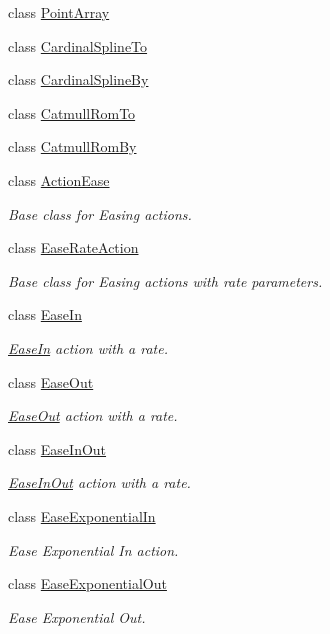 \begin{DoxyCompactItemize}
class \hyperlink{classPointArray}{Point\+Array}
\item 
class \hyperlink{classCardinalSplineTo}{Cardinal\+Spline\+To}
\item 
class \hyperlink{classCardinalSplineBy}{Cardinal\+Spline\+By}
\item 
class \hyperlink{classCatmullRomTo}{Catmull\+Rom\+To}
\item 
class \hyperlink{classCatmullRomBy}{Catmull\+Rom\+By}
\item 
class \hyperlink{classActionEase}{Action\+Ease}
\begin{DoxyCompactList}\small\item\em Base class for Easing actions. \end{DoxyCompactList}\item 
class \hyperlink{classEaseRateAction}{Ease\+Rate\+Action}
\begin{DoxyCompactList}\small\item\em Base class for Easing actions with rate parameters. \end{DoxyCompactList}\item 
class \hyperlink{classEaseIn}{Ease\+In}
\begin{DoxyCompactList}\small\item\em \hyperlink{classEaseIn}{Ease\+In} action with a rate. \end{DoxyCompactList}\item 
class \hyperlink{classEaseOut}{Ease\+Out}
\begin{DoxyCompactList}\small\item\em \hyperlink{classEaseOut}{Ease\+Out} action with a rate. \end{DoxyCompactList}\item 
class \hyperlink{classEaseInOut}{Ease\+In\+Out}
\begin{DoxyCompactList}\small\item\em \hyperlink{classEaseInOut}{Ease\+In\+Out} action with a rate. \end{DoxyCompactList}\item 
class \hyperlink{classEaseExponentialIn}{Ease\+Exponential\+In}
\begin{DoxyCompactList}\small\item\em Ease Exponential In action. \end{DoxyCompactList}\item 
class \hyperlink{classEaseExponentialOut}{Ease\+Exponential\+Out}
\begin{DoxyCompactList}\small\item\em Ease Exponential Out. \end{DoxyCompactList}\item 

\end{DoxyCompactItemize}
